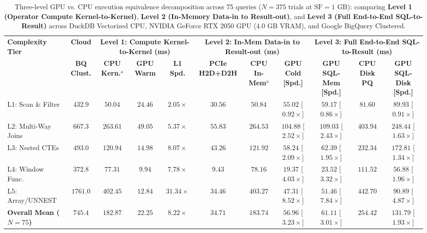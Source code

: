 \documentclass[10pt,a4paper]{article}
\newenvironment{fitasttable}{%
  \begin{lrbox}{\asttblbox}%
}{%
  \end{lrbox}%
  \sbox{\asttblboxB}{%
    \ifdim\wd\asttblbox>0.96\textwidth
      \resizebox{0.96\textwidth}{!}{\usebox{\asttblbox}}%
    \else
      \usebox{\asttblbox}%
    \fi
  }%
  \ifdim\ht\asttblboxB>0.72\textheight
    \resizebox{!}{0.72\textheight}{\usebox{\asttblboxB}}%
  \else
    \usebox{\asttblboxB}%
  \fi
}
\begin{document}
\begin{table}[!htbp]
\centering
\caption{Three-level GPU vs. CPU execution equivalence decomposition across 75 queries ($N=375$ trials at $\text{SF}=1\text{ GB}$): comparing \textbf{Level 1 (Operator Compute Kernel-to-Kernel)}, \textbf{Level 2 (In-Memory Data-in to Result-out)}, and \textbf{Level 3 (Full End-to-End SQL-to-Result)} across DuckDB Vectorized CPU, NVIDIA GeForce RTX 2050 GPU ($4.0\text{ GB}$ VRAM), and Google BigQuery Clustered.}\label{tab:jbd_gpu_3level_t4}
\label{tab:gpu_pcie_decomposition}
\scriptsize
\setlength{\tabcolsep}{3.2pt}
\renewcommand{\arraystretch}{1.12}
\begin{fitasttable}
\begin{tabular}{@{}lcccccccccc@{}}
\toprule
\multirow{2}{*}{\textbf{Complexity Tier}} & \textbf{Cloud} & \multicolumn{3}{c}{\textbf{Level 1: Compute Kernel-to-Kernel (ms)}} & \multicolumn{3}{c}{\textbf{Level 2: In-Mem Data-in to Result-out (ms)}} & \multicolumn{3}{c}{\textbf{Level 3: Full End-to-End SQL-to-Result (ms)}} \\
\cmidrule(lr){2-2} \cmidrule(lr){3-5} \cmidrule(lr){6-8} \cmidrule(lr){9-11}
 & \textbf{BQ Clust.} & \textbf{CPU Kern.$^{\text{a}}$} & \textbf{GPU Warm} & \textbf{L1 Spd.} & \textbf{PCIe H2D+D2H} & \textbf{CPU In-Mem$^{\text{a}}$} & \textbf{GPU Cold [Spd.]} & \textbf{GPU SQL-Mem [Spd.]} & \textbf{CPU Disk PQ} & \textbf{GPU SQL-Disk [Spd.]} \\
\midrule
L1: Scan \& Filter & $432.9$ & $50.04$ & $24.46$ & $2.05\times$ & $30.56$ & $50.84$ & $55.02$ [$0.92\times$] & $59.17$ [$0.86\times$] & $81.60$ & $89.93$ [$0.91\times$] \\
L2: Multi-Way Joins & $667.3$ & $263.61$ & $49.05$ & $5.37\times$ & $55.83$ & $264.53$ & $104.88$ [$2.52\times$] & $109.03$ [$2.43\times$] & $403.94$ & $248.44$ [$1.63\times$] \\
L3: Nested CTEs & $493.0$ & $120.94$ & $14.98$ & $8.07\times$ & $43.26$ & $121.92$ & $58.24$ [$2.09\times$] & $62.39$ [$1.95\times$] & $232.34$ & $172.81$ [$1.34\times$] \\
L4: Window Func. & $372.8$ & $77.31$ & $9.94$ & $7.78\times$ & $9.43$ & $78.16$ & $19.37$ [$4.03\times$] & $23.52$ [$3.32\times$] & $111.52$ & $56.88$ [$1.96\times$] \\
L5: Array/UNNEST & $1761.0$ & $402.45$ & $12.84$ & $31.34\times$ & $34.46$ & $403.27$ & $47.31$ [$8.52\times$] & $51.46$ [$7.84\times$] & $442.70$ & $90.89$ [$4.87\times$] \\
\midrule
\textbf{Overall Mean ($N=75$)} & $\mathbf{745.4}$ & $\mathbf{182.87}$ & $\mathbf{22.25}$ & $\mathbf{8.22\times}$ & $\mathbf{34.71}$ & $\mathbf{183.74}$ & $\mathbf{56.96}$ [$\mathbf{3.23\times}$] & $\mathbf{61.11}$ [$\mathbf{3.01\times}$] & $\mathbf{254.42}$ & $\mathbf{131.79}$ [$\mathbf{1.93\times}$] \\

\end{tabular}
\end{fitasttable}
\end{table}
\end{document}
